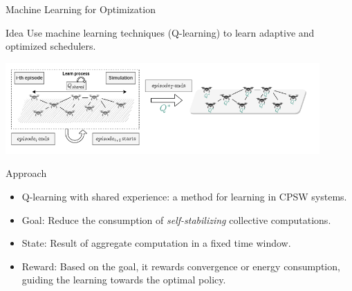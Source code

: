 \documentclass[presentation, 9pt,169]{beamer}\mode<presentation>{\usetheme{AMSBolognaFC}}
\begin{document}
\begin{frame}{Machine Learning for Optimization}
\begin{alertblock}{Idea}
Use machine learning techniques (Q-learning) to learn adaptive and optimized schedulers.
\end{alertblock}
\begin{center}
  \includegraphics[width=0.9\textwidth]{img/algorithm-learning.png}
\end{center}
\begin{alertblock}{Approach}
\begin{itemize}
\item Q-learning with shared experience: a method for learning in CPSW systems.
\item Goal: Reduce the consumption of \emph{self-stabilizing} collective computations.
\item State: Result of aggregate computation in a fixed time window.
\item Reward: Based on the goal, it rewards convergence or energy consumption, guiding the learning towards the optimal policy.
\end{itemize}
\end{alertblock}
\end{frame}
\end{document}
